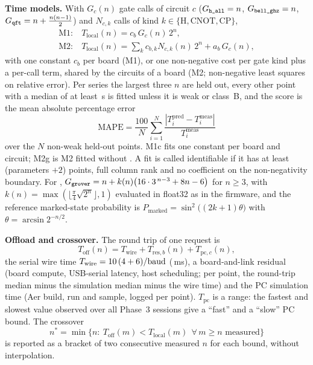 \documentclass[conference,a4paper,10pt]{IEEEtran}
\begin{document}
\textbf{Time models.} With $G_c(n)$ gate calls of circuit $c$ ($G_{\texttt{h\_all}}=n$, $G_{\texttt{bell\_ghz}}=n$, $G_{\texttt{qft}}=n+\frac{n(n-1)}{2}$) and $N_{c,k}$ calls of kind $k\in\{\mathrm{H},\mathrm{CNOT},\mathrm{CP}\}$,
\begin{align}
\text{M1:}\ & T_{\mathrm{local}}(n)=c_b\,G_c(n)\,2^n,\label{eq:m1}\\
\text{M2:}\ & T_{\mathrm{local}}(n)=\textstyle\sum_{k}c_{b,k}N_{c,k}(n)\,2^n+a_b\,G_c(n),\label{eq:m2}
\end{align}
with one constant $c_b$ per board (M1), or one non-negative cost per gate kind plus a per-call term, shared by the circuits of a board (M2; non-negative least squares on relative error). Per series the largest three $n$ are held out, every other point with a median of at least \ModelFloorUs\,\textmu s is fitted unless it is weak or class~B, and the score is the mean absolute percentage error
\begin{equation}\label{eq:mape}\mathrm{MAPE}=\frac{100}{N}\sum_{i=1}^{N}\frac{|T^{\mathrm{pred}}_i-T^{\mathrm{meas}}_i|}{T^{\mathrm{meas}}_i}\end{equation}
over the $N$ non-weak held-out points. M1c fits one constant per board and circuit; M2g is M2 fitted without \grover. A fit is called identifiable if it has at least (parameters $+2$) points, full column rank and no coefficient on the non-negativity boundary. For \grover, $G_{\texttt{grover}}=n+k(n)\bigl(16\cdot3^{\,n-3}+8n-6\bigr)$ for $n\ge3$, with $k(n)=\max(\lfloor\frac{\pi}{4}\sqrt{2^n}\rfloor,1)$ evaluated in float32 as in the firmware, and the reference marked-state probability is $P_{\mathrm{marked}}=\sin^2\bigl((2k+1)\theta\bigr)$ with $\theta=\arcsin 2^{-n/2}$.

\textbf{Offload and crossover.} The round trip of one request is
\begin{equation}\label{eq:off}T_{\mathrm{off}}(n)=T_{\mathrm{wire}}+T_{\mathrm{res},b}(n)+T_{\mathrm{pc},c}(n),\end{equation}
the serial wire time $T_{\mathrm{wire}}=10\,(4+6)/\mathrm{baud}$ (\WireMs\,ms), a board-and-link residual (board compute, USB-serial latency, host scheduling; per point, the round-trip median minus the simulation median minus the wire time) and the PC simulation time (Aer build, run and sample, logged per point). $T_{\mathrm{pc}}$ is a range: the fastest and slowest value observed over all Phase~3 sessions give a ``fast'' and a ``slow'' PC bound. The crossover
\begin{equation}\label{eq:cross}n^{*}=\min\{n:\ T_{\mathrm{off}}(m)<T_{\mathrm{local}}(m)\ \ \forall\,m\ge n\text{ measured}\}\end{equation}
is reported as a bracket of two consecutive measured $n$ for each bound, without interpolation.
\end{document}
